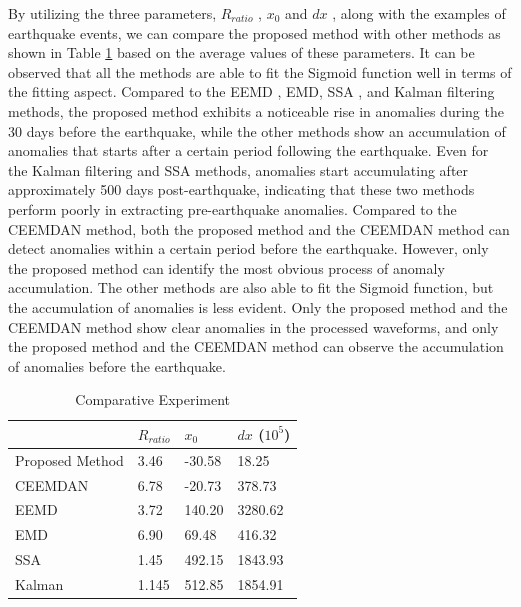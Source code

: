 \documentclass[3p,authoryear,preprint,12pt]{elsarticle}
\begin{document}
By utilizing the three parameters, $R_{ratio}$ , $x_0$ and $dx$ , along with the examples of earthquake events, we can compare the proposed method with other methods as shown in Table \ref{tab:Comparative Experiment} based on the average values of these parameters. It can be observed that all the methods are able to fit the Sigmoid function well in terms of the fitting aspect. Compared to the EEMD \citep{BarmanDetectionearthquakeinduced2016}, EMD\citep{yangEMDBasedStatistical2023}, SSA \citep{rasheedSingularSpectralControl2023}, and Kalman filtering \citep{kitaharaAdaptiveBayesianFilter2023} methods, the proposed method exhibits a noticeable rise in anomalies during the 30 days before the earthquake, while the other methods show an accumulation of anomalies that starts after a certain period following the earthquake. Even for the Kalman filtering and SSA methods, anomalies start accumulating after approximately 500 days post-earthquake, indicating that these two methods perform poorly in extracting pre-earthquake anomalies. Compared to the CEEMDAN \citep{ChenDynamicmonitoringoffshore2021} method, both the proposed method and the CEEMDAN method can detect anomalies within a certain period before the earthquake. However, only the proposed method can identify the most obvious process of anomaly accumulation. The other methods are also able to fit the Sigmoid function, but the accumulation of anomalies is less evident. Only the proposed method and the CEEMDAN method show clear anomalies in the processed waveforms, and only the proposed method and the CEEMDAN method can observe the accumulation of anomalies before the earthquake.
\begin{table}[htbp]
	\centering
	\caption{Comparative Experiment}
	\label{tab:Comparative Experiment}
	\begin{tabular}{@{}llll@{}}
		\toprule
		& \textbf{$R_{ratio}$} & \textbf{$x_0$} & \textbf{$dx$ ($10^5$)} \\ \midrule
		Proposed Method    & 3.46                 & -30.58         & 18.25                  \\
		CEEMDAN\citep{ChenDynamicmonitoringoffshore2021} &  6.78                   & -20.73               &   378.73        \\		
		EEMD\citep{BarmanDetectionearthquakeinduced2016}    & 3.72                 & 140.20         & 3280.62                \\ 
		EMD\citep{yangEMDBasedStatistical2023}     & 6.90                 & 69.48          & 416.32                 \\
		SSA\citep{rasheedSingularSpectralControl2023}     & 1.45                 & 492.15         & 1843.93                \\
		Kalman\citep{kitaharaAdaptiveBayesianFilter2023}  & 1.145                & 512.85         & 1854.91                \\
		\bottomrule
	\end{tabular}
\end{table}    
\end{document}
